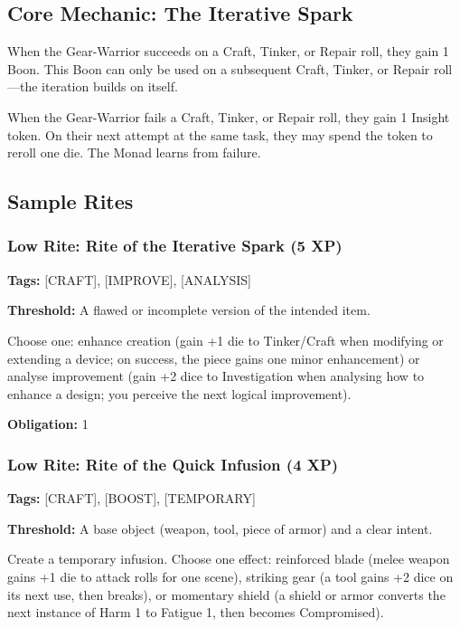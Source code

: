 \subsection{Core Mechanic: The Iterative Spark}

When the Gear-Warrior succeeds on a Craft, Tinker, or Repair roll, they gain 1 Boon. This Boon can only be used on a subsequent Craft, Tinker, or Repair roll—the iteration builds on itself.

When the Gear-Warrior fails a Craft, Tinker, or Repair roll, they gain 1 Insight token. On their next attempt at the same task, they may spend the token to reroll one die. The Monad learns from failure.

\subsection{Sample Rites}

\subsubsection{Low Rite: Rite of the Iterative Spark (5 XP)}

\textbf{Tags:} [CRAFT], [IMPROVE], [ANALYSIS]

\textbf{Threshold:} A flawed or incomplete version of the intended item.

Choose one: enhance creation (gain +1 die to Tinker/Craft when modifying or extending a device; on success, the piece gains one minor enhancement) or analyse improvement (gain +2 dice to Investigation when analysing how to enhance a design; you perceive the next logical improvement).

\textbf{Obligation:} 1

\subsubsection{Low Rite: Rite of the Quick Infusion (4 XP)}

\textbf{Tags:} [CRAFT], [BOOST], [TEMPORARY]

\textbf{Threshold:} A base object (weapon, tool, piece of armor) and a clear intent.

Create a temporary infusion. Choose one effect: reinforced blade (melee weapon gains +1 die to attack rolls for one scene), striking gear (a tool gains +2 dice on its next use, then breaks), or momentary shield (a shield or armor converts the next instance of Harm 1 to Fatigue 1, then becomes Compromised).

